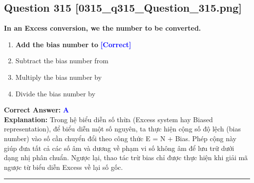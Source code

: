 \documentclass[11pt,a4paper]{article}
\begin{document}
\begin{minipage}{\textwidth}
\subsection*{Question 315 \quad \footnotesize{[0315\_q315\_Question\_315.png]}}
\noindent \textbf{In an Excess conversion, we the number to be converted.}

\begin{enumerate}[label=\Alph*.]
    \item \textbf{Add the bias number to} \hfill \textcolor{blue}{\textbf{[Correct]}}
    \item Subtract the bias number from
    \item Multiply the bias number by
    \item Divide the bias number by
\end{enumerate}

\noindent \textbf{Correct Answer:} \textcolor{blue}{\textbf{A}} \\[2pt]
\noindent \textbf{Explanation:} Trong hệ biểu diễn số thừa (Excess system hay Biased representation), để biểu diễn một số nguyên, ta thực hiện cộng số độ lệch (bias number) vào số cần chuyển đổi theo công thức E = N + Bias. Phép cộng này giúp đưa tất cả các số âm và dương về phạm vi số không âm để lưu trữ dưới dạng nhị phân chuẩn. Ngược lại, thao tác trừ bias chỉ được thực hiện khi giải mã ngược từ biểu diễn Excess về lại số gốc.

\par\vspace{0.3cm}
\hrule
\vspace{0.3cm}
\end{minipage}
\end{document}

